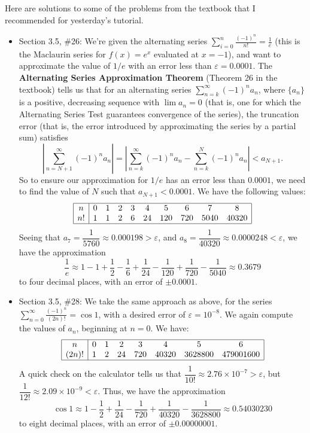 \documentclass[12pt]{article}
\newcommand{\di}{\displaystyle}
\newcommand{\abs}[1]{\left\lvert #1\right\rvert}
\begin{document}
\thispagestyle{fancy}

Here are solutions to some of the problems from the textbook that I recommended for yesterday's tutorial.

\begin{itemize}
 \item Section 3.5, \#26: We're given the alternating series $\di \sum_{i=0}^n\frac{(-1)^n}{n!} = \frac{1}{e}$ (this is the Maclaurin series for $f(x)=e^x$ evaluated at $x=-1$), and want to approximate the value of $1/e$ with an error less than $\varepsilon=0.0001$. The \textbf{Alternating Series Approximation Theorem} (Theorem 26 in the textbook) tells us that for an alternating series $\di\sum_{n=k}^\infty (-1)^na_n$, where $\{a_n\}$ is a positive, decreasing sequence with $\lim a_n = 0$ (that is, one for which the Alternating Series Test guarantees convergence of the series), the truncation error (that is, the error introduced by approximating the series by a partial sum) satisfies
\[
 \abs{\sum_{n=N+1}^\infty (-1)^na_n} = \abs{\sum_{n=k}^\infty(-1)^na_n - \sum_{n=k}^N(-1)^na_n} < a_{N+1}.
\]
So to ensure our approximation for $1/e$ has an error less than $0.0001$, we need to find the value of $N$ such that $a_{N+1}<0.0001$. We have the following values:
\[
 \begin{array}{|c|ccccccccc|}
  \hline
  n&0&1&2&3&4&5&6&7&8\\
 n!&1&1&2&6&24&120&720&5040&40320\\
\hline
 \end{array}
\]
Seeing that $a_7 = \dfrac{1}{5760}\approx 0.000198>\varepsilon$, and $a_8 = \dfrac{1}{40320} \approx 0.0000248<\varepsilon$, we have the approximation
\[
 \frac{1}{e}\approx 1-1+\frac{1}{2}-\frac{1}{6}+\frac{1}{24}-\frac{1}{120}+\frac{1}{720}-\frac{1}{5040} \approx 0.3679
\]
to four decimal places, with an error of $\pm 0.0001$.
\item Section 3.5, \#28: We take the same approach as above, for the series $\di \sum_{n=0}^\infty \frac{(-1)^n}{(2n)!} = \cos 1$, with a desired error of $\varepsilon=10^{-8}$. We again compute the values of $a_n$, beginning at $n=0$. We have:
\[
 \begin{array}{|c|ccccccc|}
  \hline
  n&0&1&2&3&4&5&6\\
  (2n)!& 1&2&24&720&40320&3628800&479001600\\
\hline
\end{array}
\]
A quick check on the calculator tells us that $\dfrac{1}{10!} \approx 2.76 \times 10^{-7} >\varepsilon$, but $\dfrac{1}{12!} \approx 2.09\times 10^{-9}<\varepsilon$. Thus, we have the approximation
\[
 \cos 1 \approx 1-\frac{1}{2}+\frac{1}{24}-\frac{1}{720}+\frac{1}{40320}-\frac{1}{3628800} \approx 0.54030230
\]
to eight decimal places, with an error of $\pm 0.00000001$.


\end{itemize}
\end{document}
